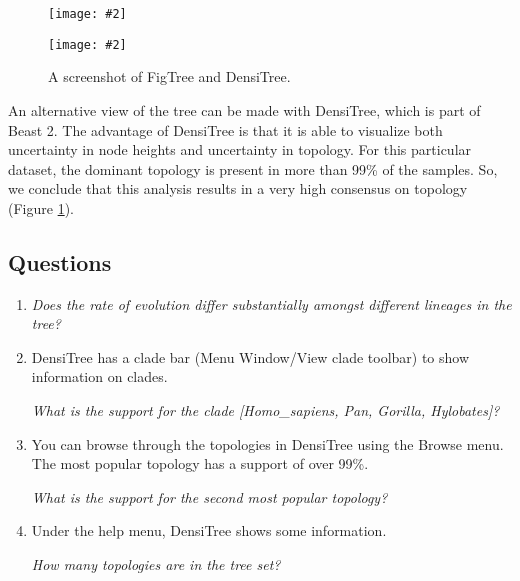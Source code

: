 \documentclass[11pt]{article}
\theoremstyle{plain}%
\theoremstyle{definition}
\theoremstyle{remark}
\newcommand{\includeimage}[2][]{%
\texttt{[image: \#2]}
}
\begin{document}
\begin{figure}
\centering	
\includeimage[width=0.9\textwidth]{figures/FigTree}
\includeimage[width=0.9\textwidth]{figures/DensiTree}
\label{fig:FigTree}
\caption{A screenshot of FigTree and DensiTree.}
\end{figure}

An alternative view of the tree can be made with DensiTree, which is part of Beast 2. The advantage
of DensiTree is that it is able to visualize both uncertainty in node heights and uncertainty in topology.
For this particular dataset, the dominant topology is present in more than 99\% of the samples. So, 
we conclude that this analysis results in a very high consensus on topology (Figure \ref{fig:FigTree}).



\newpage
\subsection*{Questions}

\begin{enumerate}
\item \textit{Does the rate of evolution differ substantially amongst different lineages in the tree?}


\item DensiTree has a clade bar (Menu Window/View clade toolbar) to show information on clades.

\textit{What is the support for the clade [Homo\_sapiens, Pan, Gorilla, Hylobates]?}


\item You can browse through the topologies in DensiTree using the Browse menu.
The most popular topology has a support of over 99\%.

\textit{What is the support for the second most popular topology?}


\item Under the help menu, DensiTree shows some information.

\textit{How many topologies are in the tree set?}


\end{enumerate}
\end{document}
